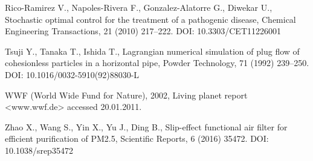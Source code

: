 \documentclass[twocolumn, 10pt]{article}
\begin{document}
Rico-Ramirez V., Napoles-Rivera F., Gonzalez-Alatorre G., Diwekar U., Stochastic optimal control for the treatment of a pathogenic disease, Chemical Engineering Transactions, 21 (2010) 217--222. DOI: 10.3303/CET11226001

Tsuji Y., Tanaka T., Ishida T., Lagrangian numerical simulation of plug flow of cohesionless particles in a horizontal pipe, Powder Technology, 71 (1992) 239--250. DOI: 10.1016/0032-5910(92)88030-L

WWF (World Wide Fund for Nature), 2002, Living planet report <www.wwf.de> accessed 20.01.2011. 

Zhao X., Wang S., Yin X., Yu J., Ding B., Slip-effect functional air filter for efficient purification of PM2.5, Scientific Reports, 6 (2016) 35472. DOI: 10.1038/srep35472
\end{document}
